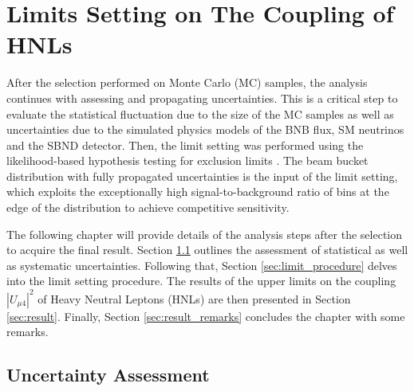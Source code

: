 \chapter{Limits Setting on The Coupling of HNLs}
\label{ChapterResult}

\ifpdf
    \graphicspath{{Chapter10/Figs/Raster/}{Chapter10/Figs/PDF/}{Chapter10/Figs/}}
\else
    \graphicspath{{Chapter10/Figs/Vector/}{Chapter10/Figs/}}
\fi


After the selection performed on Monte Carlo (MC) samples, the analysis continues with assessing and propagating uncertainties.
This is a critical step to evaluate the statistical fluctuation due to the size of the MC samples as well as uncertainties due to the simulated physics models of the BNB flux, SM neutrinos and the SBND detector.   
Then, the limit setting was performed using the likelihood-based hypothesis testing for exclusion limits \cite{asymptotic_test}.
The beam bucket distribution with fully propagated uncertainties is the input of the limit setting, which exploits the exceptionally high signal-to-background ratio of bins at the edge of the distribution to achieve competitive sensitivity.

The following chapter will provide details of the analysis steps after the selection to acquire the final result.
Section \ref{sec:uncertainty} outlines the assessment of statistical as well as systematic uncertainties. 
Following that, Section \ref{sec:limit_procedure} delves into the limit setting procedure.
The results of the upper limits on the coupling $|U_{\mu4}|^{2}$ of Heavy Neutral Leptons (HNLs) are then presented in Section \ref{sec:result}.
Finally, Section \ref{sec:result_remarks} concludes the chapter with some remarks.

\clearpage

\section{Uncertainty Assessment}
\label{sec:uncertainty}

